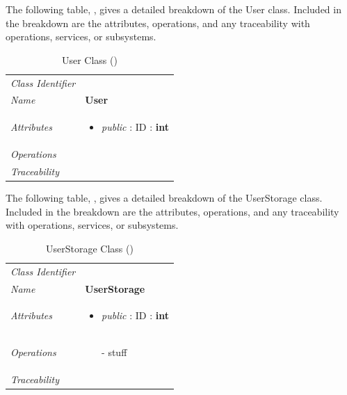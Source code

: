 \documentclass[12pt,letterpaper]{article}
\begin{document}
The following table, , gives a detailed breakdown of the User class. Included in the breakdown are the attributes, operations, and any traceability with operations, services, or subsystems.

\begin{table}[H]
    \caption{User Class ()} 
	\begin{tabu} to 
		\toprule
		Class Identifier &  \\
		Name & {\bf User} \\
		Attributes & 
		\begin{minipage}[t]{\linewidth}
		    \begin{itemize}
		        \item \textit{public} : ID : \bf{int}
			\end{itemize}
	    \end{minipage} \\

		Operations & \\
	    	Traceability & \\
		\toprule
	\end{tabu}
\end{table}

The following table, , gives a detailed breakdown of the UserStorage class. Included in the breakdown are the attributes, operations, and any traceability with operations, services, or subsystems.

\begin{table}[H]
    \caption{UserStorage Class ()} 
	\begin{tabu} to 
		\toprule
		Class Identifier &  \\
		Name & {\bf UserStorage} \\
		Attributes & 
		\begin{minipage}[t]{\linewidth}
		    \begin{itemize}
		        \item \textit{public} : ID : \bf{int}
			\end{itemize}
	    \end{minipage} \\

		Operations &
		\begin{minipage}[t]{\linewidth}
			\begin{enumerate}
			    \item[-] stuff
	        \end{enumerate}
	    \end{minipage} \\
	    	Traceability & \\
		\toprule
	\end{tabu}
\end{table}
\end{document}
